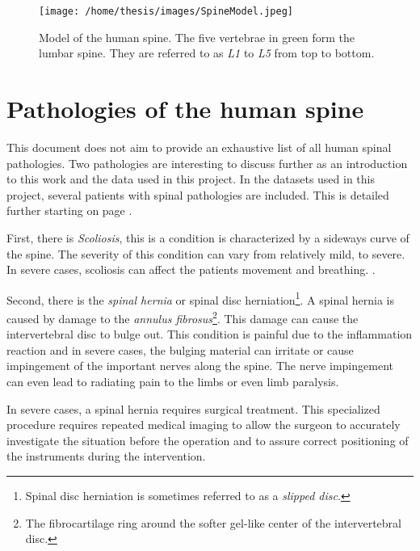 \begin{SCfigure}[][h!]
    \centering
    \texttt{[image: /home/thesis/images/SpineModel.jpeg]}
    \caption{\label{fig:spineimage}Model of the human spine. The five vertebrae in green form the lumbar spine. They are referred to as \textit{L1} to \textit{L5} from top to bottom. }
\end{SCfigure}

\section{Pathologies of the human spine}

This document does not aim to provide an exhaustive list of all human spinal pathologies. 
Two pathologies are interesting to discuss further as an introduction to this work and the data used in this project.
In the datasets used in this project, several patients with spinal pathologies are included. This is detailed further starting on page \pageref{sec:datasets}.


First, there is \textit{Scoliosis}, this is a condition is characterized by a sideways curve of the spine.
The severity of this condition can vary from relatively mild, to severe. 
In severe cases, scoliosis can affect the patients movement and breathing.
.


Second, there is the \textit{spinal hernia} or spinal disc herniation\footnote{Spinal disc herniation is sometimes referred to as a \textit{slipped disc}.}. 
A spinal hernia is caused by damage to the \textit{annulus fibrosus}\footnote{The fibrocartilage ring around the softer gel-like center of the intervertebral disc.}. 
This damage can cause the intervertebral disc to bulge out. 
This condition is painful due to the inflammation reaction and in severe cases, the bulging material can irritate or cause impingement of the important nerves along the spine.
The nerve impingement can even lead to radiating pain to the limbs or even limb paralysis.

In severe cases, a spinal hernia requires surgical treatment.
This specialized procedure requires repeated medical imaging to allow the surgeon to accurately investigate the situation before the operation and to assure correct positioning of the instruments during the intervention.



